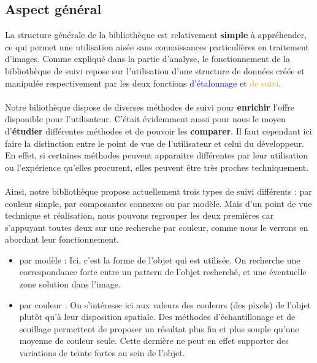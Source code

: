 \documentclass{report}
\begin{document}
				\subsection{Aspect général}
				La structure générale de la bibliothèque est relativement \textbf{simple} à appréhender, ce qui permet une utilisation aisée sans connaissances particulières en traitement d'images. Comme expliqué dans la partie d'analyse, le fonctionnement de la bibliothèque de suivi repose sur l'utilisation d'une structure de données créée et manipulée respectivement par les deux fonctions \textcolor{blue}{d'étalonnage} et \textcolor{orange}{de suivi}.
				\paragraph{} Notre biliothèque dispose de diverses méthodes de suivi pour \textbf{enrichir} l'offre disponible pour l'utilisateur. C'était évidemment aussi pour nous le moyen d'\textbf{étudier} différentes méthodes et de pouvoir les \textbf{comparer}. Il faut cependant ici faire la distinction entre le point de vue de l'utilisateur et celui du développeur. En effet, si certaines méthodes peuvent apparaitre différentes par leur utilisation ou l'expérience qu'elles procurent, elles peuvent être très proches techniquement.
				\paragraph{}Ainsi, notre bibliothèque propose actuellement trois types de suivi différents : par couleur simple, par composantes connexes ou par modèle. Mais d'un point de vue technique et réalisation, nous pouvons regrouper les deux premières car s'appuyant toutes deux sur une recherche par couleur, comme nous le verrons en abordant leur fonctionnement.\\
				\begin{itemize}
\item {\textcolor{marron}{par modèle} : } Ici, c'est la forme de l'objet qui est utilisée. On recherche une correspondance forte entre un pattern de l'objet recherché, et une éventuelle zone solution dans l'image. \\
\item {\textcolor{vert}{par couleur} : } On s'intéresse ici aux valeurs des couleurs (des pixels) de l'objet plutôt qu'à leur disposition spatiale. Des méthodes d'échantillonage et de seuillage permettent de proposer un résultat plus fin et plus souple qu'une moyenne de couleur seule. Cette dernière ne peut en effet supporter des variations de teinte fortes au sein de l'objet.
				\end{itemize}
							
\end{document}

